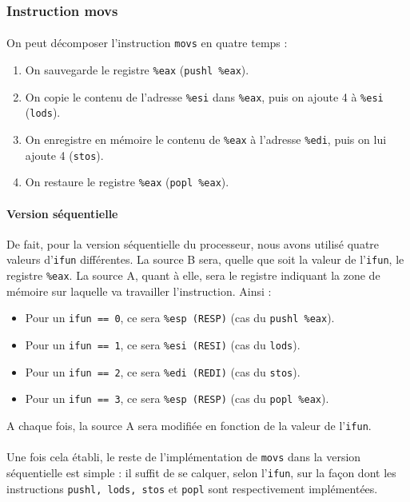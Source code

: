 \documentclass[12pt]{article}
\begin{document}
\subsubsection{Instruction movs}
\paragraph{}On peut décomposer l'instruction \verb+movs+ en quatre temps :
\begin{enumerate}
\item On sauvegarde le registre \verb+%eax+ (\verb+pushl %eax+).
\item On copie le contenu de l'adresse \verb+%esi+ dans \verb+%eax+, puis on ajoute 4 à \verb+%esi+ (\verb+lods+).
\item On enregistre en mémoire le contenu de \verb+%eax+ à l'adresse \verb+%edi+, puis on lui ajoute 4 (\verb+stos+).
\item On restaure le registre \verb+%eax+ (\verb+popl %eax+).
\end{enumerate}

\paragraph{Version séquentielle}De fait, pour la version séquentielle du processeur, nous avons utilisé quatre valeurs d'\verb+ifun+ différentes. La source B sera, quelle que soit la valeur de l'\verb+ifun+, le registre \verb+%eax+. La source A, quant à elle, sera le registre indiquant la zone de mémoire sur laquelle va travailler l'instruction. Ainsi :
\begin{itemize}
\item Pour un \verb+ifun == 0+, ce sera \verb+%esp (RESP)+ (cas du \verb+pushl %eax+).
\item Pour un \verb+ifun == 1+, ce sera \verb+%esi (RESI)+ (cas du \verb+lods+).
\item Pour un \verb+ifun == 2+, ce sera \verb+%edi (REDI)+ (cas du \verb+stos+).
  \item Pour un \verb+ifun == 3+, ce sera \verb+%esp (RESP)+ (cas du \verb+popl %eax+).
\end{itemize}
A chaque fois, la source A sera modifiée en fonction de la valeur de l'\verb+ifun+.

\paragraph{}Une fois cela établi, le reste de l'implémentation de \verb+movs+ dans la version séquentielle est simple : il suffit de se calquer, selon l'\verb+ifun+, sur la façon dont les instructions \verb+pushl, lods, stos+ et \verb+popl+ sont respectivement implémentées.
\end{document}
